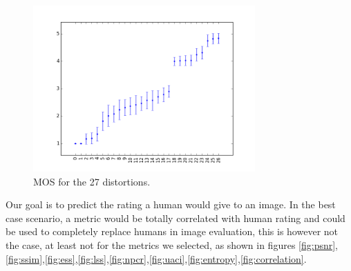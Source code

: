 \documentclass{article}
\begin{document}
\begin{figure}[ht]
  \centering
  \includegraphics[width=8.5cm]{figures/mos}
  \caption{MOS for the 27 distortions.\label{fig:mos} }
\end{figure}

Our goal is to predict the rating a human would give to an image. In the best case scenario, a metric would be totally correlated with human rating and could be used to completely replace humans in image evaluation, this is however not the case, at least not for the metrics we selected, as shown in figures \ref{fig:psnr},\ref{fig:ssim},\ref{fig:ess},\ref{fig:lss},\ref{fig:npcr},\ref{fig:uaci},\ref{fig:entropy},\ref{fig:correlation}.
\end{document}
